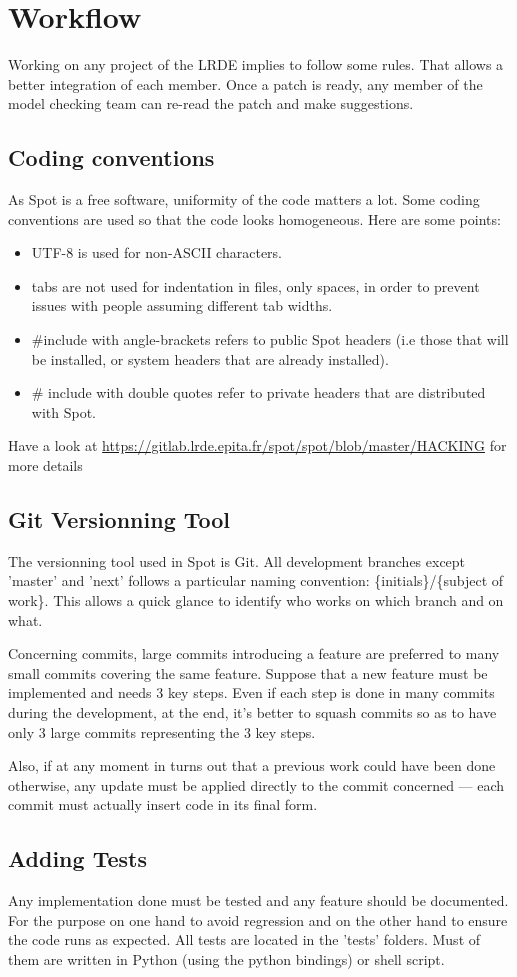 \section{Workflow}
Working on any project of the LRDE implies to follow some rules. That allows a better integration of each
member. Once a patch is ready, any member of the model checking team can re-read the patch and make
suggestions.

\subsection{Coding conventions}
As Spot is a free software, uniformity of the code matters a lot. Some coding conventions are used so that
the code looks homogeneous. Here are some points:
\begin{itemize}
 \item UTF-8 is used for non-ASCII characters.
 \item tabs are not used for indentation in files, only spaces, in order to prevent issues with people
 assuming different tab widths.
 \item \#include with angle-brackets refers to public Spot headers (i.e those that will be installed, or
 system headers that are already installed).
 \item \# include with double quotes refer to private headers that are distributed with Spot.
\end{itemize}

Have a look at \url{https://gitlab.lrde.epita.fr/spot/spot/blob/master/HACKING} for more details

\subsection{Git Versionning Tool}
The versionning tool used in Spot is Git. All development branches except 'master' and 'next' follows a
particular naming convention: \{initials\}/\{subject of work\}. This allows a quick glance to identify
who works on which branch and on what.

Concerning commits, large commits introducing a feature are preferred to many small commits covering
the same feature. Suppose that a new feature must be implemented and needs 3 key steps. Even if each step
is done in many commits during the development, at the end, it's better to squash commits so as to have
only 3 large commits representing the 3 key steps.

Also, if at any moment in turns out that a previous work
could have been done otherwise, any update must be applied directly to the commit concerned --- each commit
must actually insert code in its final form.

\subsection{Adding Tests}
Any implementation done must be tested and any feature should be documented. For the purpose on one hand
to avoid regression and on the other hand to ensure the code runs as expected. All tests are located in
the 'tests' folders. Must of them are written in Python (using the python bindings) or shell script.

